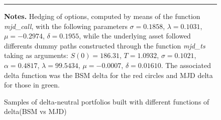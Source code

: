 \documentclass[12pt]{report}
\begin{document}
\begin{appendices}


\begin{figure}[h]
  \centering
  \rule{40mm}{20mm}
  \caption{Samples of delta-neutral portfolios built with different functions of delta(BSM vs MJD)}
  \begin{changemargin}{0.5cm}{0.5cm}
  \medskip
\footnotesize
{}\textbf{Notes.} Hedging of options, computed by means of the function \textit{mjd\_call}, with the following parameters $\sigma = 0.1858$, $\lambda = 0.1031$, $\mu = -0.2974$, $\delta = 0.1955$, while the underlying asset followed differents dummy paths constructed through the function \textit{mjd\_ts} taking as arguments: $S(0) = 186.31$, $T = 1.0932$, $\sigma = 0.1021$, $\alpha = 0.4817$, $\lambda = 99.5434$, $\mu = -0.0007$, $\delta = 0.01610$. The associated delta function was the BSM delta for the red circles and MJD delta for those in green.
  \end{changemargin}
  \label{p:analysis:mjd:hedge:deltas}
\end{figure}


\end{appendices}












\end{document}
